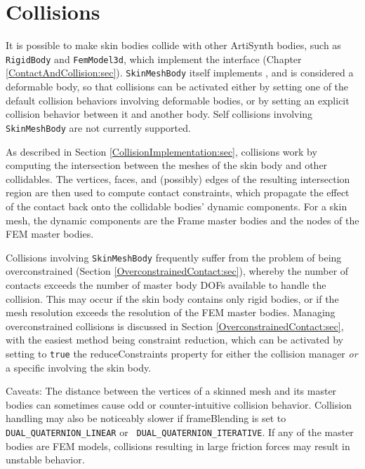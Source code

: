 \section{Collisions}
\label{SkinCollisions:sec}

It is possible to make skin bodies collide with other ArtiSynth
bodies, such as {\tt RigidBody} and {\tt FemModel3d}, which implement
the  interface
(Chapter \ref{ContactAndCollision:sec}). {\tt SkinMeshBody} itself
implements , and
is considered a deformable body, so that collisions can be activated
either by setting one of the default collision behaviors involving
deformable bodies, or by setting an explicit collision behavior
between it and another body. Self collisions involving {\tt
SkinMeshBody} are not currently supported.

As described in Section \ref{CollisionImplementation:sec}, collisions
work by computing the intersection between the meshes of the skin body
and other collidables. The vertices, faces, and (possibly) edges of
the resulting intersection region are then used to compute contact
constraints, which propagate the effect of the contact back onto the
collidable bodies' dynamic components. For a skin mesh, the dynamic
components are the Frame master bodies and the nodes of the FEM master
bodies.

Collisions involving {\tt SkinMeshBody} frequently suffer from the
problem of being overconstrained (Section
\ref{OverconstrainedContact:sec}), whereby the number of contacts
exceeds the number of master body DOFs available to handle the
collision. This may occur if the skin body contains only rigid bodies,
or if the mesh resolution exceeds the resolution of the FEM master
bodies. Managing overconstrained collisions is discussed in Section
\ref{OverconstrainedContact:sec}, with the easiest method being
constraint reduction, which can be activated by setting to {\tt true}
the {\sf reduceConstraints} property for either the collision manager
{\it or} a specific
 involving the
skin body.

\begin{sideblock}
Caveats: The distance between the vertices of a skinned mesh and its
master bodies can sometimes cause odd or counter-intuitive collision
behavior. Collision handling may also be noticeably slower if {\sf
frameBlending} is set to {\tt DUAL\_QUATERNION\_LINEAR} or {\tt
DUAL\_QUATERNION\_ITERATIVE}. If any of the master bodies are FEM
models, collisions resulting in large friction forces may result in
unstable behavior.
\end{sideblock}

